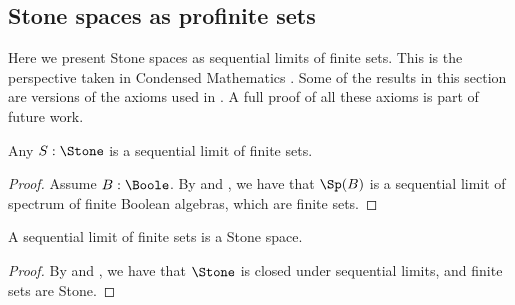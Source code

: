 
\subsection{Stone spaces as profinite sets}
Here we present Stone spaces as sequential limits of finite sets. 
This is the perspective taken in Condensed Mathematics \cite{Condensed,Dagur,Scholze}.
Some of the results in this section are versions of the axioms used in 
\cite{bc24}. A full proof of all these axioms is part of future work. 

\begin{lemma}
  Any $S:\Stone$ is a sequential limit of finite sets. 
\end{lemma}
\begin{proof}
  Assume $B:\Boole$. By  and , %
 we have that $\Sp(B)$ is a sequential limit of spectrum of finite Boolean algebras, which are finite sets. 
\end{proof}

\begin{lemma}\label{StoneAreProfinite} 
  A sequential limit of finite sets is a Stone space. 
\end{lemma}
\begin{proof}
  By  and %
  , 
  we have that $\Stone$ is closed under sequential limits, and finite sets are Stone.
\end{proof}

